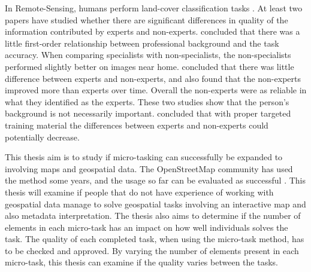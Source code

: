 In Remote-Sensing, humans perform land-cover classification tasks \citep{Salk2016}. At least two papers have studied whether there are significant differences in quality of the information contributed by experts and non-experts.
\cite{Salk2016} concluded that there was a little first-order relationship between professional background and the task accuracy.
When comparing specialists with non-specialists, the non-specialists performed slightly better on images near home. 
\cite{See2013} concluded that there was little difference between experts and non-experts, and also found that the non-experts improved more than experts over time. Overall the non-experts were as reliable in what they identified as the experts. These two studies show that the person's background is not necessarily important. \cite{See2013} concluded that with proper targeted training material the differences between experts and non-experts could potentially decrease.   

This thesis aim is to study if micro-tasking can successfully be expanded to involving maps and geospatial data. The OpenStreetMap community has used the method some years, and the usage so far can be evaluated as successful \citep{Erichsen2016}. This thesis will examine if people that do not have experience of working with geospatial data manage to solve geospatial tasks involving an interactive map and also metadata interpretation. The thesis also aims to determine if the number of elements in each micro-task has an impact on how well individuals solves the task. The quality of each completed task, when using the micro-task method, has to be checked and approved. By varying the number of elements present in each micro-task, this thesis can examine if the quality varies between the tasks. 


